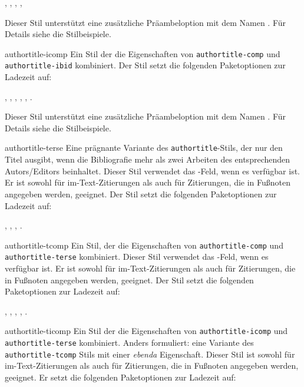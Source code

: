 \documentclass{ltxdockit}[2011/03/25]
\begin{document}
\begin{marglist}
, , , , 

Dieser Stil
unterstützt eine zusätzliche Präambeloption mit dem Namen . Für
Details siehe die Stilbeispiele. 

\item[authortitle-icomp] Ein Stil der die Eigenschaften von 
\texttt{authortitle-comp} und
\texttt{authortitle-ibid} kombiniert. Der Stil setzt die folgenden
Paketoptionen zur Ladezeit auf: 

, , , , , . 

Dieser Stil unterstützt eine zusätzliche
Präambeloption mit dem Namen . Für Details siehe die
Stilbeispiele.

\item[authortitle-terse] Eine prägnante Variante des 
\texttt{authortitle}-Stils, der nur den Titel
ausgibt, wenn die Bibliografie mehr als zwei Arbeiten des entsprechenden
Autors\slash Editors beinhaltet. Dieser Stil verwendet das
-Feld, wenn es verfügbar ist. Er ist sowohl für
im-Text-Zitierungen als auch für
Zitierungen, die in Fußnoten angegeben werden, geeignet. Der Stil setzt die
folgenden Paketoptionen zur Ladezeit auf: 

, , , .

\item[authortitle-tcomp] Ein Stil, der die Eigenschaften von 
\texttt{authortitle-comp} und
\texttt{authortitle-terse} kombiniert. Dieser Stil verwendet das
-Feld, wenn es verfügbar ist. Er ist sowohl für
im-Text-Zitierungen als auch für Zitierungen, die in Fußnoten angegeben werden,
geeignet. Der Stil setzt die folgenden Paketoptionen zur Ladezeit auf:

, , , , .

\item[authortitle-ticomp] Ein Stil der die Eigenschaften von 
\texttt{authortitle-icomp} und
\texttt{authortitle-terse} kombiniert. Anders formuliert: eine Variante des
\texttt{authortitle-tcomp} Stils mit einer \emph{ebenda} Eigenschaft. Dieser
Stil ist sowohl für im-Text-Zitierungen als auch für Zitierungen, die in
Fußnoten angegeben werden, geeignet. Er setzt die folgenden Paketoptionen zur
Ladezeit auf: 


\end{marglist}
\end{document}
